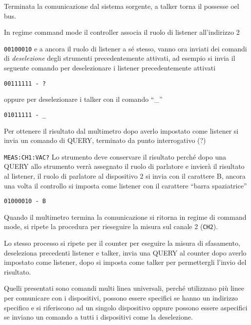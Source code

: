 Terminata la comunicazione dal sistema sorgente, a talker torna il possesse oel
bus.

In regime command mode il controller associa il ruolo di listener
all'indirizzo 2

\verb|00100010|
e a ancora il ruolo di listener a sé stesso, vanno ora inviati dei comandi di
\textit{deselezione} degli strumenti precedentemente attivati, ad esempio si
invia il seguente comando per deselezionare i listener precedentemente attivati

\verb|00111111 - ?|

oppure per deselezionare i talker con il comando ``\_''

\verb|01011111 - _|

Per ottenere il risultato dal multimetro dopo averlo impostato come listener si
invia un comando di QUERY, terminato da punto interrogativo (?)

\verb|MEAS:CH1:VAC?|
Lo strumento deve conservare il risultato perché dopo una QUERY allo strumento
verrà assegnato il ruolo di parlatore e invierà il risultato al listener, il
ruolo di parlatore al dispositivo 2 si invia con il carattere B, ancora una
volta il controllo si imposta come listener con il carattere ``barra
spaziatrice''

\verb|01000010 - B|

Quando il multimetro termina la comunicazione si ritorna in regime di command
mode, si ripete la procedura per rieseguire la misura sul canale 2 (\verb|CH2|).

Lo stesso processo si ripete per il counter per eseguire la misura di
sfasamento, deseleziona precedenti listener e talker, invia una QUERY al
counter dopo averlo impostato come listener, dopo si imposta come talker per
permettergli l'invio del risultato.



Quelli presentati sono comandi multi linea universali, perché utilizzano più
linee per comunicare con i dispositivi, possono essere specifici se hanno un
indirizzo specifico e si riferiscono ad un singolo dispositivo oppure possono
essere aspecifici se inviano un comando a tutti i dispositivi come la
deselezione.


